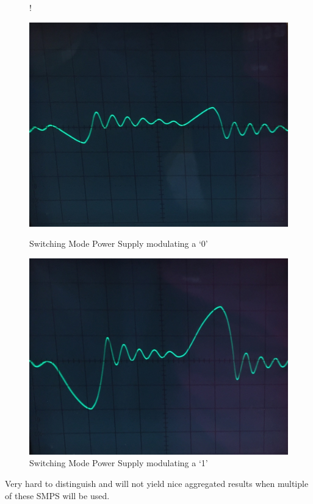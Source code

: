 \documentclass{beamer}
\begin{document}
\begin{frame}
		\begin{figure}
			 {!} {
			  \centering
			  \begin{minipage}[b]{0.48\textwidth}
			    \includegraphics[width=\textwidth]{../chapters/hardware-chapters/AC/ac-modulator/smps-led/smps-current-primary-no-load-cropped.jpg}
			    \caption{Switching Mode Power Supply modulating a `0'}
			  \end{minipage}
			  \hfill
			  \begin{minipage}[b]{0.48\textwidth}
			    \includegraphics[width=\textwidth]{../chapters/hardware-chapters/AC/ac-modulator/smps-led/smps-current-primary-with-load-cropped.jpg}
			    \caption{Switching Mode Power Supply modulating a `1'}
			  \end{minipage}
		  }
		\end{figure}

		Very hard to distinguish and will not yield nice aggregated results when multiple of these SMPS will be used.
		
	\end{frame}
\end{document}
